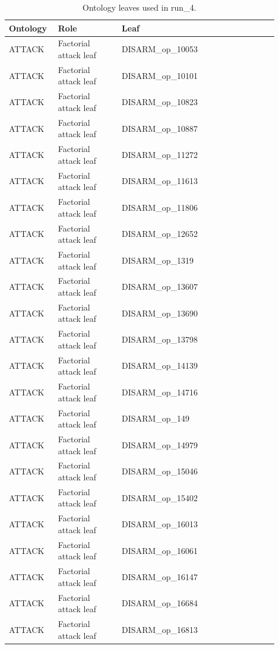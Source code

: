 \begin{table}[htbp]
\centering
\begin{threeparttable}
\caption{Ontology leaves used in run\_4.}
\label{tab:ontologies}
\small
\setlength{\tabcolsep}{4.5pt}
\renewcommand{\arraystretch}{1.10}
\begin{tabular}{p{0.14\linewidth}p{0.22\linewidth}p{0.54\linewidth}}
\toprule
Ontology & Role & Leaf \\
\midrule
ATTACK & Factorial attack leaf & DISARM\_op\_10053 \\
ATTACK & Factorial attack leaf & DISARM\_op\_10101 \\
ATTACK & Factorial attack leaf & DISARM\_op\_10823 \\
ATTACK & Factorial attack leaf & DISARM\_op\_10887 \\
ATTACK & Factorial attack leaf & DISARM\_op\_11272 \\
ATTACK & Factorial attack leaf & DISARM\_op\_11613 \\
ATTACK & Factorial attack leaf & DISARM\_op\_11806 \\
ATTACK & Factorial attack leaf & DISARM\_op\_12652 \\
ATTACK & Factorial attack leaf & DISARM\_op\_1319 \\
ATTACK & Factorial attack leaf & DISARM\_op\_13607 \\
ATTACK & Factorial attack leaf & DISARM\_op\_13690 \\
ATTACK & Factorial attack leaf & DISARM\_op\_13798 \\
ATTACK & Factorial attack leaf & DISARM\_op\_14139 \\
ATTACK & Factorial attack leaf & DISARM\_op\_14716 \\
ATTACK & Factorial attack leaf & DISARM\_op\_149 \\
ATTACK & Factorial attack leaf & DISARM\_op\_14979 \\
ATTACK & Factorial attack leaf & DISARM\_op\_15046 \\
ATTACK & Factorial attack leaf & DISARM\_op\_15402 \\
ATTACK & Factorial attack leaf & DISARM\_op\_16013 \\
ATTACK & Factorial attack leaf & DISARM\_op\_16061 \\
ATTACK & Factorial attack leaf & DISARM\_op\_16147 \\
ATTACK & Factorial attack leaf & DISARM\_op\_16684 \\
ATTACK & Factorial attack leaf & DISARM\_op\_16813 \\

\end{tabular}
\end{threeparttable}
\end{table}
